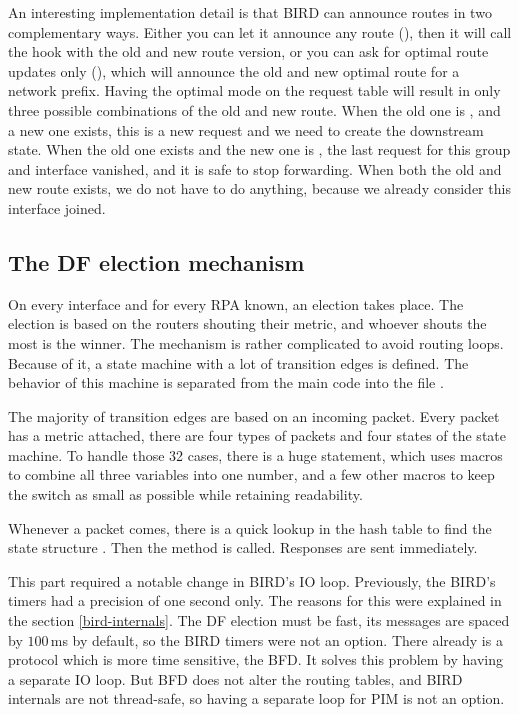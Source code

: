 An interesting implementation detail is that BIRD can announce routes in two
complementary ways. Either you can let it announce any route (),
then it will call the  hook with the old and new route version,
or you can ask for optimal route updates only (), which will
announce the old and new optimal route for a network prefix. Having the optimal
mode on the request table will result in only three possible combinations of
the old and new route. When the old one is \NULL, and a new one exists, this is a new
request and we need to create the downstream state. When the old one exists and
the new one is \NULL, the last request for this group and interface vanished,
and it is safe to stop forwarding. When both the old and new route exists, we
do not have to do anything, because we already consider this interface joined.

\subsection{The DF election mechanism}
On every interface and for every RPA known, an election takes place. The
election is based on the routers shouting their metric, and whoever shouts the
most is the winner. The mechanism is rather complicated to avoid routing loops.
Because of it, a state machine with a lot of transition edges is defined. The
behavior of this machine is separated from the main code into the file
.

The majority of transition edges are based on an incoming packet. Every packet
has a metric attached, there are four types of packets and four states of the
state machine. To handle those 32 cases, there is a huge 
statement, which uses macros to combine all three variables into one number,
and a few other macros to keep the switch as small as possible while retaining
readability.

Whenever a packet comes, there is a quick lookup in the hash table to find the
state structure . Then the  method is
called. Responses are sent immediately.

This part required a notable change in BIRD's IO loop. Previously, the BIRD's
timers had a precision of one second only. The reasons for this were explained
in the section \ref{bird-internals}. The DF election must be fast, its
messages are spaced by $100\,$ms by default, so the BIRD timers were not an
option. There already is a protocol which is more time sensitive, the BFD. It
solves this problem by having a separate IO loop. But BFD does not alter the
routing tables, and BIRD internals are not thread-safe, so having a separate
loop for PIM is not an option.

